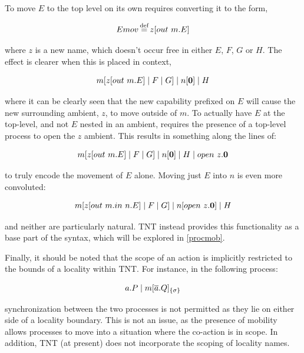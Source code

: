 To move $E$ to the top level on its own requires converting it to the
form,

\begin{equation}
Emov \operatorname{\stackrel{\textrm{def}}{=}} z[out\ m.E]
\end{equation}

\noindent where $z$ is a new name, which doesn't occur free in either
$E$, $F$, $G$ or $H$.  The effect is clearer when this is placed in
context,

\begin{equation}
m[z[out\ m.E]\;|\;F\;|\;G]\;|\;n[\textbf{0}]\;|\;H
\end{equation}

\noindent where it can be clearly seen that the new capability prefixed
on $E$ will cause the new surrounding ambient, $z$, to move outside of
$m$.  To actually have $E$ at the top-level, and not $E$ nested in an
ambient, requires the presence of a top-level process to open the $z$
ambient.  This results in something along the lines of:

\begin{equation}
m[z[out\ m.E]\;|\;F\;|\;G]\;|\;n[\textbf{0}]\;|\;H\;|\;open\ z.\textbf{0}
\end{equation}

\noindent to truly encode the movement of $E$ alone.  Moving just $E$
into $n$ is even more convoluted:

\begin{equation}
m[z[out\ m.in\ n.E]\;|\;F\;|\;G]\;|\;n[open\ z.\textbf{0}]\;|\;H
\end{equation}

\noindent and neither are particularly natural.  TNT instead provides
this functionality as a base part of the syntax, which will be explored
in \ref{procmob}.  

Finally, it should be noted that the scope of an action is implicitly
restricted to the bounds of a locality within TNT.  For instance, in the
following process:

\begin{equation}
a.P \;|\; {m}[ \overline{a}.Q ]_{\{\sigma\}}
\end{equation}

\noindent synchronization between the two processes is not permitted as
they lie on either side of a locality boundary.  This is not an issue,
as the presence of mobility allows processes to move into a situation
where the co-action is in scope.  In addition, TNT (at present) does not
incorporate the scoping of locality names.

